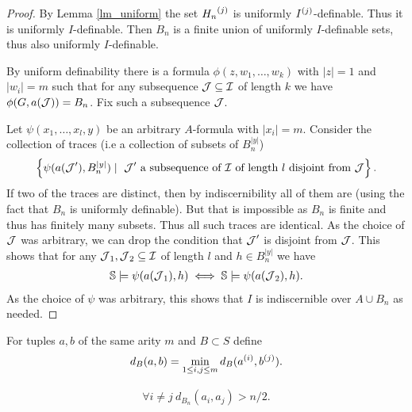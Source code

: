 \begin{proof}
  By Lemma \ref{lm_uniform} the set ${H_n}^{(j)}$ is uniformly ${I}^{(j)}$-definable.
  Thus it is uniformly $I$-definable.
  Then $B_n$ is a finite union of uniformly $I$-definable sets, thus also uniformly $I$-definable.

  By uniform definability there is a formula $\phi(z, w_1, \ldots , w_k)$ with $|z| = 1$ and $|w_i| = m$ such that
  for any subsequence $\operatorname{\mathcal J} \subseteq \operatorname{\mathcal I}$ of length $k$ we have $\phi(G, a(\operatorname{\mathcal J})) = B_n$.
  Fix such a subsequence $\operatorname{\mathcal J}$.

  Let $\psi(x_1, \ldots, x_l ,y)$ be an arbitrary $A$-formula with $|x_i| = m$. 
  Consider the collection of traces (i.e a collection of subsets of $B_n^{|y|}$)
  \begin{align*}
    \left\{\psi(a(\operatorname{\mathcal J}'), B_n^{|y|}) \mid \text{ $\operatorname{\mathcal J}'$ a subsequence of $\operatorname{\mathcal I}$ of length $l$ disjoint from $\operatorname{\mathcal J}$}\right\}.
  \end{align*}
  If two of the traces are distinct, then by indiscernibility all of them are (using the fact that $B_n$ is uniformly definable).
  But that is impossible as $B_n$ is finite and thus has finitely many subsets.
  Thus all such traces are identical.
  As the choice of $\operatorname{\mathcal J}$ was arbitrary, we can drop the condition that $\operatorname{\mathcal J}'$ is disjoint from $\operatorname{\mathcal J}$.
  This shows that for any $\operatorname{\mathcal J}_1, \operatorname{\mathcal J}_2 \subseteq \operatorname{\mathcal I}$ of length $l$ and $h \in B_n^{|y|}$ we have
  \begin{align*}
    \mathbb S \models \psi(a(\operatorname{\mathcal J}_1), h) \iff \mathbb S \models \psi(a(\operatorname{\mathcal J}_2), h)    .
  \end{align*}
  As the choice of $\psi$ was arbitrary, this shows that $I$ is indiscernible over $A \cup B_n$ as needed.
\end{proof}

\begin{Definition}
  For tuples $a,b$ of the same arity $m$ and $B \subset S$ define
  \begin{align*}
    d_B(a,b) = \min_{1 \leq i,j \leq m} d_B({a}^{(i)}, {b}^{(j)}).
  \end{align*}
\end{Definition}

\begin{Lemma} \label{inf_dis_gen}
  \begin{align*}
    \forall i \neq j \ d_{B_n}(a_i, a_j) > n/2.
  \end{align*}
\end{Lemma}


